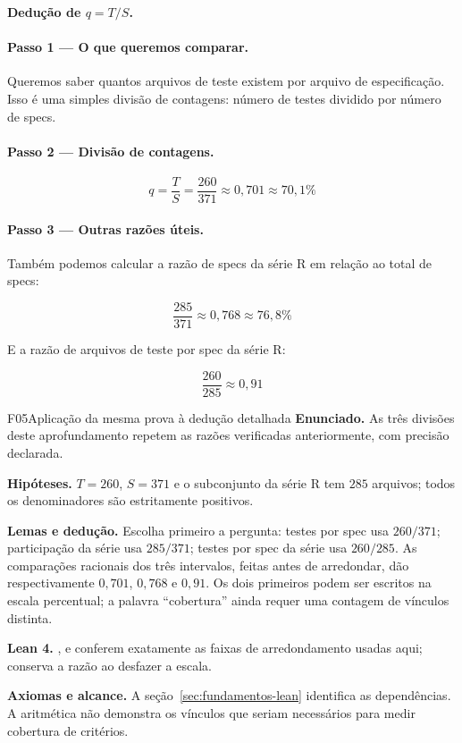 \begin{metodo}
\textbf{Dedução de $q = T/S$.}

\paragraph{Passo 1 — O que queremos comparar.}
Queremos saber quantos arquivos de teste existem por arquivo de especificação. Isso é uma simples divisão de contagens: número de testes dividido por número de specs.

\paragraph{Passo 2 — Divisão de contagens.}

\[
\boxed{q = \frac{T}{S} = \frac{260}{371} \approx 0{,}701 \approx 70{,}1\%}
\]

\paragraph{Passo 3 — Outras razões úteis.}
Também podemos calcular a razão de specs da série R em relação ao total de specs:

\[
\frac{285}{371} \approx 0{,}768 \approx 76{,}8\%
\]

E a razão de arquivos de teste por spec da série R:

\[
\frac{260}{285} \approx 0{,}91
\]

\end{metodo}

\begin{formalizacao}{F05}{Aplicação da mesma prova à dedução detalhada}
\textbf{Enunciado.} As três divisões deste aprofundamento repetem as razões verificadas anteriormente, com precisão declarada.

\textbf{Hipóteses.} $T=260$, $S=371$ e o subconjunto da série R tem $285$ arquivos; todos os denominadores são estritamente positivos.

\textbf{Lemas e dedução.} Escolha primeiro a pergunta: testes por spec usa $260/371$; participação da série usa $285/371$; testes por spec da série usa $260/285$. As comparações racionais dos três intervalos, feitas antes de arredondar, dão respectivamente $0{,}701$, $0{,}768$ e $0{,}91$. Os dois primeiros podem ser escritos na escala percentual; a palavra ``cobertura'' ainda requer uma contagem de vínculos distinta.

\textbf{Lean 4.} ,  e  conferem exatamente as faixas de arredondamento usadas aqui;  conserva a razão ao desfazer a escala.

\textbf{Axiomas e alcance.} A seção~\ref{sec:fundamentos-lean} identifica as dependências. A aritmética não demonstra os vínculos que seriam necessários para medir cobertura de critérios.
\end{formalizacao}

